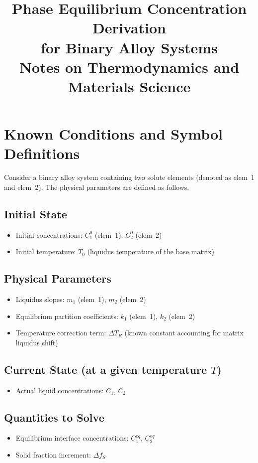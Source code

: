 \documentclass[12pt, a4paper]{article}
\title{\textbf{Phase Equilibrium Concentration Derivation\\for Binary Alloy Systems}\\[0.5em]
\large Notes on Thermodynamics and Materials Science}
\author{}
\date{}
\begin{document}
\maketitle
\tableofcontents
\newpage

\section{Known Conditions and Symbol Definitions}

Consider a binary alloy system containing two solute elements (denoted as elem~1 and elem~2).
The physical parameters are defined as follows.

\subsection{Initial State}
\begin{itemize}
  \item Initial concentrations: $C_1^0$ (elem~1), $C_2^0$ (elem~2)
  \item Initial temperature: $T_0$ (liquidus temperature of the base matrix)
\end{itemize}

\subsection{Physical Parameters}
\begin{itemize}
  \item Liquidus slopes: $m_1$ (elem~1), $m_2$ (elem~2) \quad [K/at.\%]
  \item Equilibrium partition coefficients: $k_1$ (elem~1), $k_2$ (elem~2) \quad [dimensionless]
  \item Temperature correction term: $\Delta T_R$ (known constant accounting for matrix liquidus shift)
\end{itemize}

\subsection{Current State (at a given temperature $T$)}
\begin{itemize}
  \item Actual liquid concentrations: $C_1$, $C_2$
\end{itemize}

\subsection{Quantities to Solve}
\begin{itemize}
  \item Equilibrium interface concentrations: $C_1^{eq}$, $C_2^{eq}$
  \item Solid fraction increment: $\Delta f_S$
\end{itemize}
\end{document}
